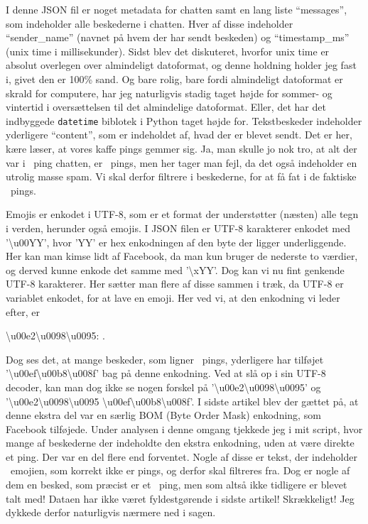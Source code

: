 \begin{article}
I denne JSON fil er noget metadata for chatten samt en lang liste ``messages'', som indeholder alle beskederne i chatten. Hver af disse indeholder ``sender\_name'' (navnet på hvem der har sendt beskeden) og ``timestamp\_ms'' (unix time i millisekunder). Sidst blev det diskuteret, hvorfor unix time er absolut overlegen over almindeligt datoformat, og denne holdning holder jeg fast i, givet den er 100\% sand.
Og bare rolig, bare fordi almindeligt datoformat er skrald for computere, har jeg naturligvis stadig taget højde for sommer- og vintertid i oversættelsen til det almindelige datoformat. Eller, det har det indbyggede \texttt{datetime} biblotek i Python taget højde for.
Tekstbeskeder indeholder yderligere ``content'', som er indeholdet af, hvad der er blevet sendt. Det er her, kære læser, at vores kaffe pings gemmer sig. Ja, man skulle jo nok tro, at alt der var i \coffee\ ping chatten, er \coffee\ pings, men her tager man fejl, da det også indeholder en utrolig masse spam. Vi skal derfor filtrere i beskederne, for at få fat i de faktiske \coffee\ pings.

Emojis er enkodet i UTF-8, som er et format der understøtter (næsten) alle tegn i verden, herunder også emojis. I JSON filen er UTF-8 karakterer enkodet med '\textbackslash u00YY', hvor 'YY' er hex enkodningen af den byte der ligger underliggende. Her kan man kimse lidt af Facebook, da man kun bruger de nederste to værdier, og derved kunne enkode det samme med '\textbackslash xYY'.
Dog kan vi nu fint genkende UTF-8 karakterer. Her sætter man flere af disse sammen i træk, da UTF-8 er variablet enkodet, for at lave en emoji. Her ved vi, at den enkodning vi leder efter, er
\begin{center}
	\textbackslash u00e2\textbackslash u0098\textbackslash u0095: \coffee \; .
\end{center}
Dog ses det, at mange beskeder, som ligner \coffee\ pings, yderligere har tilføjet '\textbackslash u00ef\textbackslash u00b8\textbackslash u008f' bag på denne enkodning. Ved at slå op i sin UTF-8 decoder, kan man dog ikke se nogen forskel på '\textbackslash u00e2\textbackslash u0098\textbackslash u0095' og '\textbackslash u00e2\textbackslash u0098\textbackslash u0095 \textbackslash u00ef\textbackslash u00b8\textbackslash u008f'. I sidste artikel blev der gættet på, at denne ekstra del var en særlig BOM (Byte Order Mask) enkodning, som Facebook tilføjede.
Under analysen i denne omgang tjekkede jeg i mit script, hvor mange af beskederne der indeholdte den ekstra enkodning, uden at være direkte et ping. Der var en del flere end forventet.
Nogle af disse er tekst, der indeholder \coffee\ emojien, som korrekt ikke er pings, og derfor skal filtreres fra. Dog er nogle af dem en besked, som præcist er et \coffee\ ping, men som altså ikke tidligere er blevet talt med! Dataen har ikke været fyldestgørende i sidste artikel! Skrækkeligt! Jeg dykkede derfor naturligvis nærmere ned i sagen.


\end{article}
